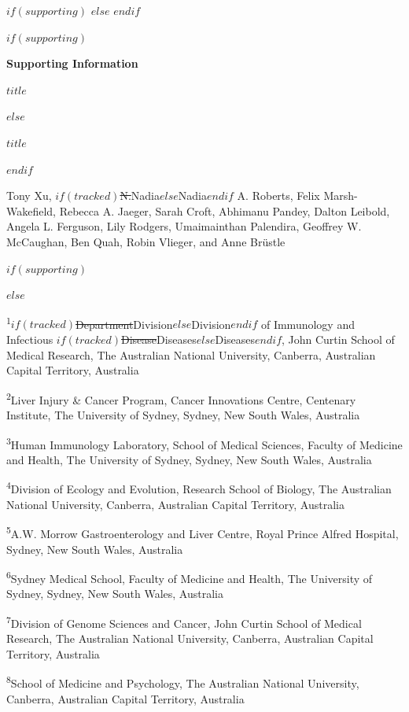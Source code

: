 \documentclass[ASNA]{latex/wiley/USG}
\begin{document}
\pagestyle{plain}
\setlength{\parindent}{0pt}
\setlength{\parskip}{\baselineskip}
\raggedbottom

$if(supporting)$
\newcommand{\aff}[1]{}
$else$
\newcommand{\aff}[1]{\textsuperscript{#1}}
$endif$
\begin{center}
$if(supporting)$
{\LARGE\bfseries Supporting Information\par}
\vspace{1em}
{\large\bfseries $title$\par}
$else$
{\LARGE\bfseries $title$\par}
$endif$
\vspace{1em}
{\normalsize
Tony Xu\aff{1},
$if(tracked)$\textcolor{revisionred}{\sout{N.}}\textcolor{revisionblue}{Nadia}$else$Nadia$endif$ A. Roberts\aff{1},
Felix Marsh-Wakefield\aff{2,3},
Rebecca A. Jaeger\aff{1},
Sarah Croft\aff{1},
Abhimanu Pandey\aff{1},
Dalton Leibold\aff{4},
Angela L. Ferguson\aff{2,3},
Lily Rodgers\aff{2,3},
Umaimainthan Palendira\aff{3},
Geoffrey W. McCaughan\aff{2,5,6},
Ben Quah\aff{7},
Robin Vlieger\aff{8$if(tracked)$\textcolor{revisionred}{\sout{,*}}$endif$}, and
Anne Brüstle\aff{1,*}\par}
$if(supporting)$
\end{center}
$else$
\vspace{0.8em}
{\small
\textsuperscript{1}$if(tracked)$\textcolor{revisionred}{\sout{Department}}\textcolor{revisionblue}{Division}$else$Division$endif$ of Immunology and Infectious $if(tracked)$\textcolor{revisionred}{\sout{Disease}}\textcolor{revisionblue}{Diseases}$else$Diseases$endif$, John Curtin School of Medical Research, The Australian National University, Canberra, Australian Capital Territory, Australia\par
\textsuperscript{2}Liver Injury \& Cancer Program, Cancer Innovations Centre, Centenary Institute, The University of Sydney, Sydney, New South Wales, Australia\par
\textsuperscript{3}Human Immunology Laboratory, School of Medical Sciences, Faculty of Medicine and Health, The University of Sydney, Sydney, New South Wales, Australia\par
\textsuperscript{4}Division of Ecology and Evolution, Research School of Biology, The Australian National University, Canberra, Australian Capital Territory, Australia\par
\textsuperscript{5}A.W. Morrow Gastroenterology and Liver Centre, Royal Prince Alfred Hospital, Sydney, New South Wales, Australia\par
\textsuperscript{6}Sydney Medical School, Faculty of Medicine and Health, The University of Sydney, Sydney, New South Wales, Australia\par
\textsuperscript{7}Division of Genome Sciences and Cancer, John Curtin School of Medical Research, The Australian National University, Canberra, Australian Capital Territory, Australia\par
\textsuperscript{8}School of Medicine and Psychology, The Australian National University, Canberra, Australian Capital Territory, Australia\par}
\end{document}
